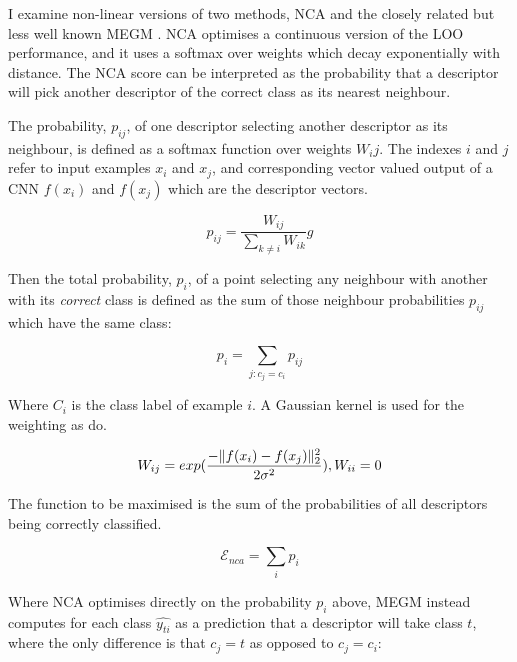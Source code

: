 I examine non-linear versions of two methods, \gls{NCA} \cite{Goldberger2004} and the closely related but less well known \gls{MEGM} \cite {Zaidi2011}. \gls{NCA} optimises a continuous version of the \gls{LOO} performance, and it uses a softmax over weights which decay exponentially with distance. The \gls{NCA} score can be interpreted as the probability that a descriptor will pick another descriptor of the correct class as its nearest neighbour. 

The probability, $ p_{ij} $, of one descriptor selecting another descriptor as its neighbour, is defined as a softmax function over weights $W_ij$. The indexes $ i $ and $ j $ refer to input examples $x_i$ and $x_j$, and corresponding vector valued output of a \gls{CNN} $f(x_i)$ and $f(x_j)$ which are the descriptor vectors.

\begin{equation}
\label{eq:nca_prob_pair}
p_{ij} =  \frac {W_{ij}} {\sum_{k \neq i}{W_{ik}}}g
\end{equation}

Then the total probability, $ p_i $, of a point selecting any neighbour with another with its \emph{correct} class is defined as the sum of those neighbour probabilities $p_{ij}$ which have the same class:

\begin{equation}
\label{eq:nca_prob}
p_{i} =  \sum_{j:c_j = c_i}{p_{ij}}
\end{equation}

Where $ C_i $ is the class label of example $ i $. A Gaussian kernel is used for the weighting as \cite{Zaidi2011} do. 

\begin{equation}
 \label{eq:gaussian_kernel}
W_{ij} = exp(\frac{-\lVert f(x_i) - f(x_j) \rVert^2_2 }{2\sigma^2}), \space W_{ii} = 0
\end{equation}


The function to be maximised is the sum of the probabilities of all descriptors being correctly classified.

\begin{equation}
\label{eq:nca_loss}
\mathcal{E}_{nca} =  \sum_i {p_i}
\end{equation}

Where \gls{NCA} optimises directly on the probability $ p_{i} $ above, \gls{MEGM} instead computes for each class $ \hat{y_{ti}} $ as a prediction that a descriptor will take class $ t $, where the only difference is that $ c_j = t $ as opposed to $ c_j = c_i $:

